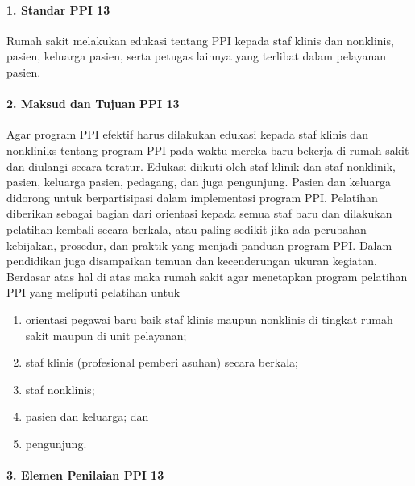 \documentclass[
]{book}
\providecommand{\tightlist}{%
  \setlength{\itemsep}{0pt}\setlength{\parskip}{0pt}}
\begin{document}
\hypertarget{standar-ppi-13}{%
\paragraph*{1. Standar PPI 13}\label{standar-ppi-13}}

Rumah sakit melakukan edukasi tentang PPI kepada staf klinis dan nonklinis, pasien, keluarga pasien, serta petugas lainnya yang terlibat dalam pelayanan pasien.

\hypertarget{maksud-dan-tujuan-ppi-13}{%
\paragraph*{2. Maksud dan Tujuan PPI 13}\label{maksud-dan-tujuan-ppi-13}}

Agar program PPI efektif harus dilakukan edukasi kepada staf klinis dan nonkliniks tentang program PPI pada waktu mereka baru bekerja di rumah sakit dan diulangi secara teratur. Edukasi diikuti oleh staf klinik dan staf nonklinik, pasien, keluarga pasien, pedagang, dan juga pengunjung. Pasien dan keluarga didorong untuk berpartisipasi dalam implementasi program PPI. Pelatihan diberikan sebagai bagian dari orientasi kepada semua staf baru dan dilakukan pelatihan kembali secara berkala, atau paling sedikit jika ada perubahan kebijakan, prosedur, dan praktik yang menjadi panduan program PPI. Dalam pendidikan juga disampaikan temuan dan kecenderungan ukuran kegiatan. Berdasar atas hal di atas maka rumah sakit agar menetapkan program pelatihan PPI yang meliputi pelatihan untuk

\begin{enumerate}
\def\labelenumi{\alph{enumi}.}
\tightlist
\item
  orientasi pegawai baru baik staf klinis maupun nonklinis di tingkat rumah sakit maupun di unit pelayanan;
\item
  staf klinis (profesional pemberi asuhan) secara berkala;
\item
  staf nonklinis;
\item
  pasien dan keluarga; dan
\item
  pengunjung.
\end{enumerate}

\hypertarget{elemen-penilaian-ppi-13}{%
\paragraph*{3. Elemen Penilaian PPI 13}\label{elemen-penilaian-ppi-13}}
\end{document}
